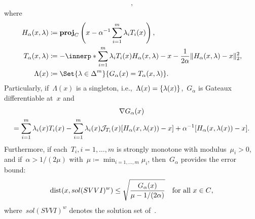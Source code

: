 \documentclass[../../main]{subfiles}
\begin{document}
\begin{example}
\begin{description}
\begin{multline}
            ,\end{multline}
            where
            \begin{align}
                H_\alpha(x, \lambda) &\coloneqq \proj_C\left( x - \alpha^{-1} \sum_{i = 1}^{m} \lambda_i T_i(x) \right), \\
                T_\alpha(x, \lambda) &\coloneqq - \innerp*{\sum_{i = 1}^{m} \lambda_i T_i(x)}{H_\alpha(x, \lambda) - x} - \frac{1}{2 \alpha} \norm{H_\alpha(x, \lambda) - x}_2^2, \\
                \Lambda(x) &\coloneqq \Set{\lambda \in \simplex^m}{G_\alpha(x) = T_\alpha(x, \lambda)}
            .\end{align}
            Particularly, if~$\Lambda(x)$ is a singleton, i.e.,~$\Lambda(x) = \lbrace\lambda(x)\rbrace$,~$G_\alpha$ is Gateaux differentiable at~$x$ and
            \begin{multline}
                \nabla G_\alpha(x) \\
                = \sum_{i = 1}^{m} \lambda_i(x) T_i(x) - \sum_{i = 1}^{m} \lambda_i(x) \mathcal{J}_{T_i}(x) [H_\alpha(x, \lambda(x)) - x] + \alpha^{-1} [H_\alpha(x, \lambda(x)) - x]
            .\end{multline}
            Furthermore, if each~$T_i, i = 1, \dots, m$ is strongly monotone with modulus~$\mu_i > 0$, and if~$\alpha > 1 / (2 \mu)$ with~$\mu \coloneqq \min_{i = 1, \dots, m} \mu_i$, then~$G_\alpha$ provides the error bound:
            \begin{equation}
                \operatorname{dist}(x, sol(SVVI)^w) \le \sqrt{\frac{G_\alpha(x)}{\mu - 1 / (2 \alpha)}} \quad \text{for all~$x \in C$}
            ,\end{equation} 
            where~$sol(SVVI)^w$ denotes the solution set of~.
    \end{description}
\end{example}
\end{document}
